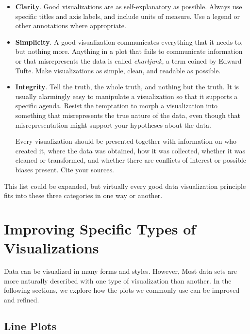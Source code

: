 \begin{itemize}
    \item \textbf{Clarity}.
    Good visualizations are as self-explanatory as possible.
    Always use specific titles and axis labels, and include units of measure.
    Use a legend or other annotations where appropriate.

    \item \textbf{Simplicity}.
    A good visualization communicates everything that it needs to, but nothing more.
    Anything in a plot that fails to communicate information or that misrepresents the data is called \emph{chartjunk}, a term coined by Edward Tufte.
    Make visualizations as simple, clean, and readable as possible.

    \item \textbf{Integrity}.
    Tell the truth, the whole truth, and nothing but the truth.
    It is usually alarmingly easy to manipulate a visualization so that it supports a specific agenda.
    Resist the temptation to morph a visualization into something that misrepresents the true nature of the data, even though that misrepresentation might support your hypotheses about the data.

    Every visualization should be presented together with information on who created it, where the data was obtained, how it was collected, whether it was cleaned or transformed, and whether there are conflicts of interest or possible biases present.
    Cite your sources.
\end{itemize}

This list could be expanded, but virtually every good data visualization principle fits into these three categories in one way or another.

\section*{Improving Specific Types of Visualizations} %

Data can be visualized in many forms and styles.
However, Most data sets are more naturally described with one type of visualization than another.
In the following sections, we explore how the plots we commonly use can be improved and refined.

\subsection*{Line Plots} %

